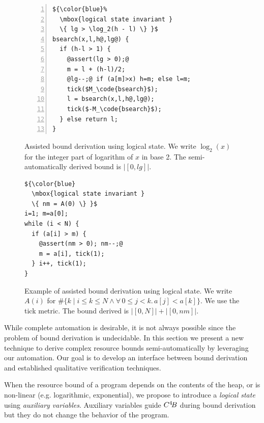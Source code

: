 \documentclass[nocopyrightspace,preprint,pldi]{sigplanconf-pldi15}
\begin{document}
\begin{figure}
\vspace{-.3cm}
\begin{lstlisting}[numbers=left]
${\color{blue}%
  \mbox{logical state invariant }
  \{ lg > \log_2(h - l) \} }$
bsearch(x,l,h@,lg@) {
  if (h-l > 1) {
    @assert(lg > 0);@
    m = l + (h-l)/2;
    @lg--;@ if (a[m]>x) h=m; else l=m;
    tick($M_\code{bsearch}$);
    l = bsearch(x,l,h@,lg@);
    tick($-M_\code{bsearch}$);
  } else return l;
}
\end{lstlisting}
\vspace{-.2cm}
\caption{Assisted bound derivation using logical state.
  We write $\log_2(x)$ for the integer part of
  logarithm of $x$ in base 2.
  The semi-automatically derived bound is $|[0,lg]|$.
  }
\label{fig:xmplbsaux}
\end{figure}

\ifdefined\fullversion
\begin{figure}
\begin{lstlisting}
${\color{blue}
  \mbox{logical state invariant }
  \{ nm = A(0) \} }$
i=1; m=a[0];
while (i < N) {
  if (a[i] > m) {
    @assert(nm > 0); nm--;@
    m = a[i], tick(1);
  } i++, tick(1);
}
\end{lstlisting}
\caption{Example of assisted bound derivation using logical state.
  We write $A(i)$ for
  $\#\{ k \mid i \le k \le N \land \forall\, 0\le j<k.\, a[j] < a[k]\}$.
  We use the tick metric.  The bound derived is $|[0,N]| + |[0,nm]|$.
  }
\label{fig:xmplmax}
\end{figure}
\fi

While complete automation is desirable, it is not always possible
since the problem of bound derivation is undecidable.  In this section
we present a new technique to derive complex resource bounds
semi-automatically by leveraging our automation. Our goal is to
develop an interface between bound derivation and
established qualitative verification techniques.

When the resource bound of a program depends on the contents of the
heap, or is non-linear (e.g. logarithmic, exponential), we propose to
introduce a \emph{logical state} using \emph{auxiliary variables}.
Auxiliary variables guide $C^4\!B$ during bound derivation
but they do not change the behavior of the program.
\end{document}
